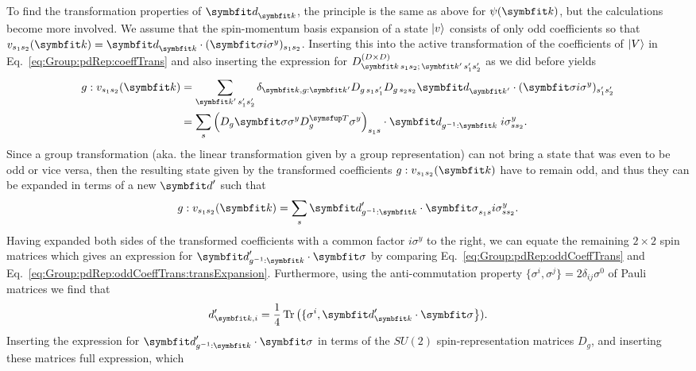 To find the transformation properties of $\v{d}_\v{k}$, the principle is the same as above for $\psi(\v{k})$, but the calculations become more involved.
We assume that the spin-momentum basis expansion of a state $\lvert v \rangle$ consists of only odd coefficients so that
$v_{s_1s_2}(\v{k}) = \v{d}_\v{k}\cdot(\v{\sigma}i\sigma^y)_{s_1s_2}$. Inserting this into the active transformation of the coefficients of $\lvert V \rangle$ in
Eq.~\eqref{eq:Group:pdRep:coeffTrans} and also inserting the expression for $D^{(D\times D)}_{\v{k}\,s_1s_2;\,\v{k}'\,s_1's_2'}$ as we did before yields
\begin{equation}
    \label{eq:Group:pdRep:oddCoeffTrans}
    \begin{split}
        g:v_{s_1s_2}(\v{k}) &= \sum_{\v{k}'\,s_1's_2'}\delta_{\v{k},g:\v{k}'}D_{g\,s_1s_1'}D_{g\,s_2s_2}\v{d}_{\v{k}'}\cdot(\v{\sigma}i\sigma^y)_{s_1's_2'}\\
        &= \sum_s\Big(D_g\v{\sigma}\sigma^yD_g^\trans\sigma^y\Big)_{s_1s}\cdot\v{d}_{g^{-1}:\v{k}}\;i\sigma^y_{ss_2}.
    \end{split}
\end{equation}
Since a group transformation (aka. the linear transformation given by a group representation) can not bring a state that was even to be odd or vice versa,
then the resulting state given by the transformed coefficients $g:v_{s_1s_2}(\v{k})$ have to remain odd, and thus they can be expanded in terms of a new
$\v{d}'$ such that 
\begin{equation}
    \label{eq:Group:pdRep:oddCoeffTrans:transExpansion}
    g:v_{s_1s_2}(\v{k}) = \sum_s\v{d}'_{g^{-1}:\v{k}}\cdot\v{\sigma}_{s_1s}i\sigma^y_{ss_2}.
\end{equation}
Having expanded both sides of the transformed coefficients with a common factor $i\sigma^y$ to the right, we can equate the remaining $2\times2$ spin
matrices which gives an expression for $\v{d}'_{g^{-1}:\v{k}}\cdot\v{\sigma}$ by comparing Eq.~\eqref{eq:Group:pdRep:oddCoeffTrans} and
Eq.~\eqref{eq:Group:pdRep:oddCoeffTrans:transExpansion}.
Furthermore, using the anti-commutation property $\{\sigma^i,\sigma^j\} = 2\delta_{ij}\sigma^0$ of Pauli matrices we find that
\begin{equation}
    \label{eq:Group:pdRep:projectingD}
    d'_{\v{k},i} = \frac{1}{4}\tr\big(\{\sigma^i, \v{d}'_\v{k}\cdot\v{\sigma}\big\}).
\end{equation}
Inserting the expression for $\v{d}'_{g^{-1}:\v{k}}\cdot\v{\sigma}$ in terms of the $SU(2)$ spin-representation matrices $D_g$, and inserting these
matrices full expression, which
